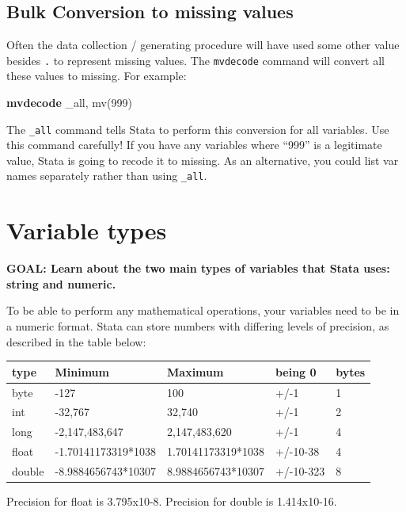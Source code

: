 \documentclass[
]{book}
\newenvironment{Shaded}{\begin{snugshade}}{\end{snugshade}}
\newcommand{\DataTypeTok}[1]{\textcolor[rgb]{0.13,0.29,0.53}{#1}}
\newcommand{\KeywordTok}[1]{\textcolor[rgb]{0.13,0.29,0.53}{\textbf{#1}}}
\newcommand{\NormalTok}[1]{#1}
\begin{document}
\hypertarget{bulk-conversion-to-missing-values}{%
\subsection{Bulk Conversion to missing values}\label{bulk-conversion-to-missing-values}}

Often the data collection / generating procedure will have used some other value besides \texttt{.} to represent missing values. The \texttt{mvdecode} command will convert all these values to missing. For example:

\begin{Shaded}
\begin{Highlighting}[]
\KeywordTok{mvdecode} \DataTypeTok{\_all}\NormalTok{, mv(999)}
\end{Highlighting}
\end{Shaded}

The \texttt{\_all} command tells Stata to perform this conversion for all variables. Use this command carefully! If you have any variables where ``999'' is a legitimate value, Stata is going to recode it to missing. As an alternative, you could list var names separately rather than using \texttt{\_all}.

\hypertarget{variable-types}{%
\section{Variable types}\label{variable-types}}

\textbf{GOAL: Learn about the two main types of variables that Stata uses: string and numeric.}

To be able to perform any mathematical operations, your variables need to be in a numeric format. Stata can store numbers with differing levels of precision, as described in the table below:

\begin{longtable}[]{@{}lllll@{}}
\toprule
type & Minimum & Maximum & being 0 & bytes\tabularnewline
\midrule
\endhead
byte & -127 & 100 & +/-1 & 1\tabularnewline
int & -32,767 & 32,740 & +/-1 & 2\tabularnewline
long & -2,147,483,647 & 2,147,483,620 & +/-1 & 4\tabularnewline
float & -1.70141173319*1038 & 1.70141173319*1038 & +/-10-38 & 4\tabularnewline
double & -8.9884656743*10307 & 8.9884656743*10307 & +/-10-323 & 8\tabularnewline
\bottomrule
\end{longtable}

Precision for float is 3.795x10-8. Precision for double is 1.414x10-16.
\end{document}
